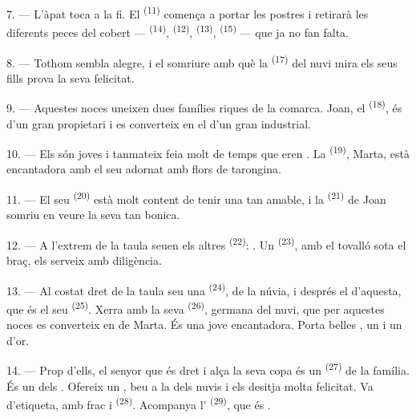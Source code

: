7. --- L'àpat toca a la fi. El  \textsuperscript{(11)} comença a portar les
postres i retirarà les diferents peces del cobert ---
 \textsuperscript{(14)}, 
\textsuperscript{(12)},  \textsuperscript{(13)},
 \textsuperscript{(15)} --- que ja no fan falta.

\VUsaut{3.0mm}

8. --- Tothom sembla alegre, i el somriure amb què la  \textsuperscript{(17)} del
nuvi mira els seus fills prova la seva felicitat.

9. --- Aquestes noces uneixen dues famílies riques de la comarca. Joan, el
 \textsuperscript{(18)}, és  d'un gran propietari i es
converteix en el  d'un gran industrial.

10. --- Els  són joves i tanmateix feia molt de temps que eren
. La  \textsuperscript{(19)}, Marta, està
encantadora amb el seu  adornat amb flors de tarongina.

11. --- El seu  \textsuperscript{(20)} està molt content de tenir una
 tan amable, i la  \textsuperscript{(21)} de Joan
somriu en veure la seva  tan bonica.

12. --- A l'extrem de la taula seuen els altres  \textsuperscript{(22)}:
. Un
 \textsuperscript{(23)}, amb el tovalló sota el braç, els
serveix amb diligència.

\VUsaut{3.0mm}

13. --- Al costat dret de la taula seu una  \textsuperscript{(24)},
 de la núvia, i després el  d'aquesta, que és el seu
 \textsuperscript{(25)}. Xerra amb la seva 
\textsuperscript{(26)}, germana del nuvi, que per aquestes noces es converteix en
 de Marta. És una jove encantadora. Porta belles , un
 i un
 d'or.

14. --- Prop d'ells, el senyor que és dret i alça la seva copa és un
 \textsuperscript{(27)} de la família. És un dels . Ofereix un , beu a la  dels nuvis i els desitja molta
felicitat. Va d'etiqueta, amb frac i  \textsuperscript{(28)}.
Acompanya l' \textsuperscript{(29)}, que és .

